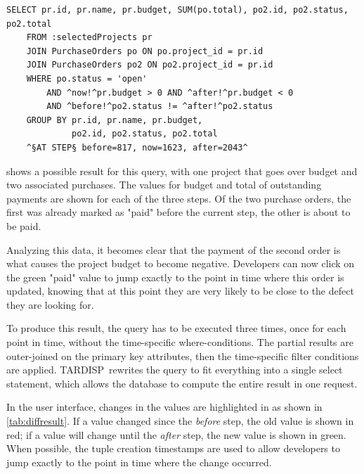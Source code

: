 \documentclass[english,conference,final]{IEEEtran}
\newcommand{\tool}{TAR\-DISP}
\begin{document}
\begin{lstlisting}[language=HanaSQL,float=t,caption={Example of a time-diff query: "Select all projects that will go over budget and their respective purchase orders"},label=lst:tdiff]
	SELECT pr.id, pr.name, pr.budget, SUM(po.total), po2.id, po2.status, po2.total
	FROM :selectedProjects pr
	JOIN PurchaseOrders po ON po.project_id = pr.id
	JOIN PurchaseOrders po2 ON po2.project_id = pr.id
	WHERE po.status = 'open'
		AND ^now!^pr.budget > 0 AND ^after!^pr.budget < 0
		AND ^before!^po2.status != ^after!^po2.status
	GROUP BY pr.id, pr.name, pr.budget, 
	         po2.id, po2.status, po2.total
	^§AT STEP§ before=817, now=1623, after=2043^
\end{lstlisting}
\timediffresult
{} shows a possible result for this query, with one project that goes over budget and two associated purchases.
The values for budget and total of outstanding payments are shown for each of the three steps.
Of the two purchase orders, the first was already marked as "paid" before the current step, the other is about to be paid.

Analyzing this data, it becomes clear that the payment of the second order is what causes the project budget to become negative.
Developers can now click on the green "paid" value to jump exactly to the point in time where this order is updated, knowing that at this point they are very likely to be close to the defect they are looking for.

To produce this result, the query has to be executed three times, once for each point in time, without the time-specific where-conditions.
The partial results are outer-joined on the primary key attributes, then the time-specific filter conditions are applied.
\tool\ rewrites the query to fit everything into a single select statement, which allows the database to compute the entire result in one request.

In the user interface, changes in the values are highlighted in as shown in \cref{tab:diffresult}.
If a value changed since the \emph{before} step, the old value is shown in red; if a value will change until the \emph{after} step, the new value is shown in green.
When possible, the tuple creation timestamps are used to allow developers to jump exactly to the point in time where the change occurred.
\end{document}
